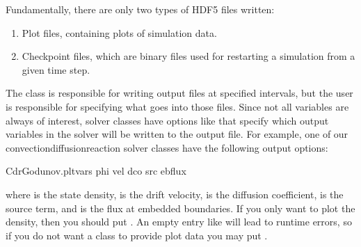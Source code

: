 \documentclass[letterpaper,10pt,english]{sphinxmanual}
\begin{document}
Fundamentally, there are only two types of HDF5 files written:
\begin{enumerate}
%
\item {} 
Plot files, containing plots of simulation data.

\item {} 
Checkpoint files, which are binary files used for restarting a simulation from a given time step.

\end{enumerate}

The {\hyperref[\detokenize{Source/Driver:chap-driver}]{}} class is responsible for writing output files at specified intervals, but the user is responsible for specifying what goes into those files.
Since not all variables are always of interest, solver classes have options like  that specify which output variables in the solver will be written to the output file.
For example, one of our convection\sphinxhyphen{}diffusion\sphinxhyphen{}reaction solver classes have the following output options:

\begin{sphinxVerbatim}[commandchars=\\\{\},formatcom=\scriptsize]
CdrGodunov.plt\PYGZus{}vars  phi vel dco src ebflux 
\end{sphinxVerbatim}

where  is the state density,  is the drift velocity,  is the diffusion coefficient,  is the source term, and  is the flux at embedded boundaries.
If you only want to plot the density, then you should put .
An empty entry like  will lead to run\sphinxhyphen{}time errors, so if you do not want a class to provide plot data you may put .
\end{document}

